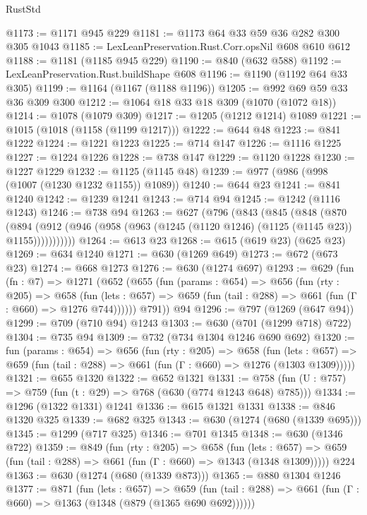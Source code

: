\begin{lexlean}{RustStd}
\begin{coremodule}
{\begin{coremodule}
{{{{{{{{{{@1173 := @1171 @945 @229
@1181 := @1173 @64 @33 @59 @36 @282 @300 @305 @1043
@1185 := LexLeanPreservation.Rust.Corr.opsNil @608 @610 @612
@1188 := @1181 (@1185 @945 @229)
@1190 := @840 (@632 @588)
@1192 := LexLeanPreservation.Rust.buildShape @608
@1196 := @1190 (@1192 @64 @33 @305)
@1199 := @1164 (@1167 (@1188 @1196))
@1205 := @992 @69 @59 @33 @36 @309 @300
@1212 := @1064 @18 @33 @18 @309 (@1070 (@1072 @18))
@1214 := @1078 (@1079 @309)
@1217 := @1205 (@1212 @1214) @1089
@1221 := @1015 (@1018 (@1158 (@1199 @1217)))
@1222 := @644 @48
@1223 := @841 @1222
@1224 := @1221 @1223
@1225 := @714 @147
@1226 := @1116 @1225
@1227 := @1224 @1226
@1228 := @738 @147
@1229 := @1120 @1228
@1230 := @1227 @1229
@1232 := @1125 (@1145 @48)
@1239 := @977 (@986 (@998 (@1007 (@1230 @1232 @1155)) @1089))
@1240 := @644 @23
@1241 := @841 @1240
@1242 := @1239 @1241
@1243 := @714 @94
@1245 := @1242 (@1116 @1243)
@1246 := @738 @94
@1263 := @627
    (@796
      (@843
        (@845
          (@848
            (@870
              (@894
                (@912 (@946 (@958 (@963 (@1245 (@1120 @1246) (@1125 (@1145 @23)) @1155)))))))))))
@1264 := @613 @23
@1268 := @615 (@619 @23) (@625 @23)
@1269 := @634 @1240
@1271 := @630 (@1269 @649)
@1273 := @672 (@673 @23)
@1274 := @668 @1273
@1276 := @630 (@1274 @697)
@1293 := @629
    (fun (fn : @7) =>
    @1271
      (@652
        (@655
          (fun (params : @654) =>
          @656
            (fun (rty : @205) =>
            @658
              (fun (lets : @657) =>
              @659 (fun (tail : @288) => @661 (fun (Γ : @660) => @1276 @744))))))
        @791))
    @94
@1296 := @797 (@1269 (@647 @94))
@1299 := @709 (@710 @94) @1243
@1303 := @630 (@701 (@1299 @718) @722)
@1304 := @735 @94
@1309 := @732 (@734 @1304 @1246 @690 @692)
@1320 := fun (params : @654) =>
  @656
    (fun (rty : @205) =>
    @658
      (fun (lets : @657) =>
      @659 (fun (tail : @288) => @661 (fun (Γ : @660) => @1276 (@1303 @1309)))))
@1321 := @655 @1320
@1322 := @652 @1321
@1331 := @758 (fun (U : @757) => @759 (fun (t : @29) => @768 (@630 (@774 @1243 @648) @785)))
@1334 := @1296 (@1322 @1331) @1241
@1336 := @615 @1321 @1331
@1338 := @846 @1320 @325
@1339 := @682 @325
@1343 := @630 (@1274 (@680 (@1339 @695)))
@1345 := @1299 (@717 @325)
@1346 := @701 @1345
@1348 := @630 (@1346 @722)
@1359 := @849
    (fun (rty : @205) =>
    @658
      (fun (lets : @657) =>
      @659 (fun (tail : @288) => @661 (fun (Γ : @660) => @1343 (@1348 @1309)))))
    @224
@1363 := @630 (@1274 (@680 (@1339 @873)))
@1365 := @880 @1304 @1246
@1377 := @871
    (fun (lets : @657) =>
    @659 (fun (tail : @288) => @661 (fun (Γ : @660) => @1363 (@1348 (@879 (@1365 @690 @692))))))
}}}}}}}}}}
\end{coremodule}}
\end{coremodule}
\end{lexlean}
